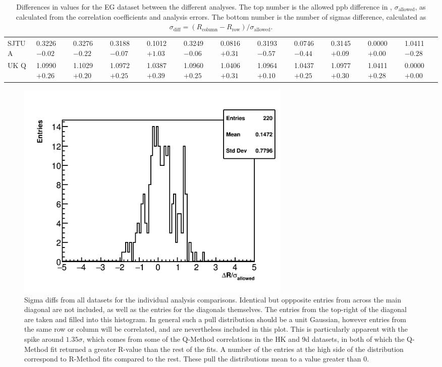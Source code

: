 \begin{landscape}
\begin{table}
\begin{tabularx}{1\linewidth}{@{\extracolsep{\fill}}lXXXXXXXXXXX}
	SJTU A & 0.3226 $-0.02$ & 0.3276 $-0.22$ & 0.3188 $-0.07$ & 0.1012 $+1.03$ & 0.3249 $-0.06$ & 0.0816 $+0.31$ & 0.3193 $-0.57$ & 0.0746 $-0.44$ & 0.3145 $+0.09$ & 0.0000 $+0.00$ & 1.0411 $-0.28$  \\
	UK Q   & 1.0990 $+0.26$ & 1.1029 $+0.20$ & 1.0972 $+0.25$ & 1.0387 $+0.39$ & 1.0960 $+0.25$ & 1.0406 $+0.31$ & 1.0964 $+0.10$ & 1.0437 $+0.25$ & 1.0977 $+0.30$ & 1.0411 $+0.28$ & 0.0000 $+0.00$  \\
  \bottomrule
\end{tabularx}
\caption[]{Differences in \R values for the EG dataset between the different analyses. The top number is the allowed ppb difference in \R, $\sigma_{\text{allowed}}$, as calculated from the correlation coefficients and analysis errors. The bottom number is the number of sigmas difference, calculated as $\sigma_{\text{diff}} = (R_{\text{column}}-R_{\text{row}})/\sigma_{\text{allowed}}$.}
\label{tab:EG_diff}
\end{table}
\end{landscape}






\begin{figure}[]
\centering
\includegraphics[width=0.65\textwidth]{AllSigmas}
\caption{Sigma diffs from all datasets for the individual analysis comparisons. Identical but oppposite entries from across the main diagonal are not included, as well as the entries for the diagonals themselves. The entries from the top-right of the diagonal are taken and filled into this histogram. In general such a pull distribution should be a unit Gaussian, however entries from the same row or column will be correlated, and are nevertheless included in this plot. This is particularly apparent with the spike around $1.35\sigma$, which comes from some of the Q-Method correlations in the HK and 9d datasets, in both of which the Q-Method fit returned a greater R-value than the rest of the fits. A number of the entries at the high side of the distribution correspond to R-Method fits compared to the rest. These pull the distributions mean to a value greater than 0.}
\label{fig:AllSigmas}
\end{figure}




